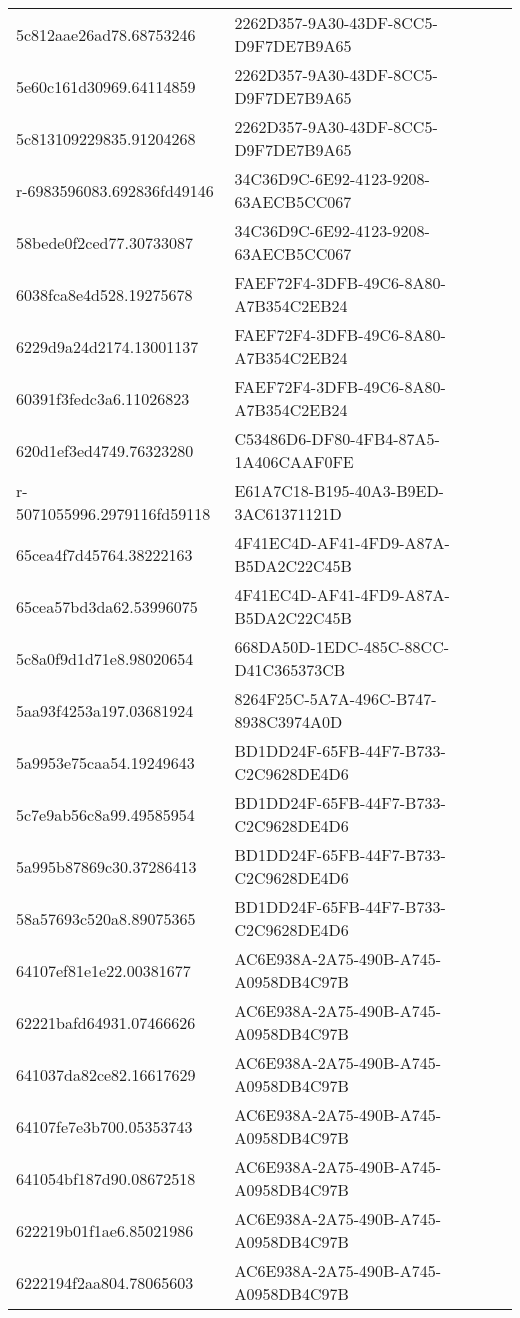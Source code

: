\begin{tabular}{ll}
5c812aae26ad78.68753246 & 2262D357-9A30-43DF-8CC5-D9F7DE7B9A65 \\
5e60c161d30969.64114859 & 2262D357-9A30-43DF-8CC5-D9F7DE7B9A65 \\
5c813109229835.91204268 & 2262D357-9A30-43DF-8CC5-D9F7DE7B9A65 \\
r-6983596083.692836fd49146 & 34C36D9C-6E92-4123-9208-63AECB5CC067 \\
58bede0f2ced77.30733087 & 34C36D9C-6E92-4123-9208-63AECB5CC067 \\
6038fca8e4d528.19275678 & FAEF72F4-3DFB-49C6-8A80-A7B354C2EB24 \\
6229d9a24d2174.13001137 & FAEF72F4-3DFB-49C6-8A80-A7B354C2EB24 \\
60391f3fedc3a6.11026823 & FAEF72F4-3DFB-49C6-8A80-A7B354C2EB24 \\
620d1ef3ed4749.76323280 & C53486D6-DF80-4FB4-87A5-1A406CAAF0FE \\
r-5071055996.2979116fd59118 & E61A7C18-B195-40A3-B9ED-3AC61371121D \\
65cea4f7d45764.38222163 & 4F41EC4D-AF41-4FD9-A87A-B5DA2C22C45B \\
65cea57bd3da62.53996075 & 4F41EC4D-AF41-4FD9-A87A-B5DA2C22C45B \\
5c8a0f9d1d71e8.98020654 & 668DA50D-1EDC-485C-88CC-D41C365373CB \\
5aa93f4253a197.03681924 & 8264F25C-5A7A-496C-B747-8938C3974A0D \\
5a9953e75caa54.19249643 & BD1DD24F-65FB-44F7-B733-C2C9628DE4D6 \\
5c7e9ab56c8a99.49585954 & BD1DD24F-65FB-44F7-B733-C2C9628DE4D6 \\
5a995b87869c30.37286413 & BD1DD24F-65FB-44F7-B733-C2C9628DE4D6 \\
58a57693c520a8.89075365 & BD1DD24F-65FB-44F7-B733-C2C9628DE4D6 \\
64107ef81e1e22.00381677 & AC6E938A-2A75-490B-A745-A0958DB4C97B \\
62221bafd64931.07466626 & AC6E938A-2A75-490B-A745-A0958DB4C97B \\
641037da82ce82.16617629 & AC6E938A-2A75-490B-A745-A0958DB4C97B \\
64107fe7e3b700.05353743 & AC6E938A-2A75-490B-A745-A0958DB4C97B \\
641054bf187d90.08672518 & AC6E938A-2A75-490B-A745-A0958DB4C97B \\
622219b01f1ae6.85021986 & AC6E938A-2A75-490B-A745-A0958DB4C97B \\
6222194f2aa804.78065603 & AC6E938A-2A75-490B-A745-A0958DB4C97B \\

\end{tabular}
